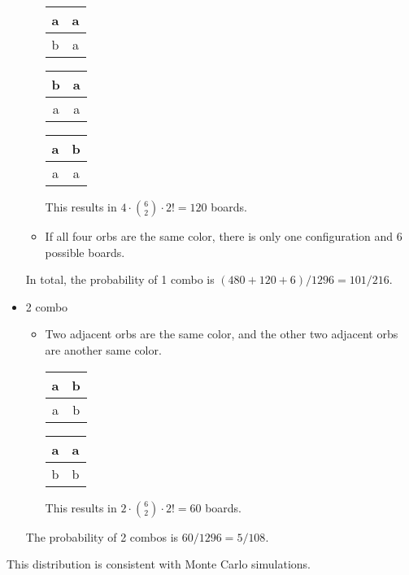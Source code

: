 \documentclass[12pt]{article}
\theoremstyle{definition}
\begin{document}
\begin{itemize}
\begin{itemize}
\begin{center}
            \quad
            \begin{tabular}{|c|c|}
            \hline
            a & a \\
            \hline
            b & a \\
            \hline
            \end{tabular}
            \quad
            \begin{tabular}{|c|c|}
            \hline
            b & a \\
            \hline
            a & a \\
            \hline
            \end{tabular}
            \quad
            \begin{tabular}{|c|c|}
            \hline
            a & b \\
            \hline
            a & a \\
            \hline
            \end{tabular}
        \end{center}
        This results in $4\cdot \binom{6}{2}\cdot 2!=120$ boards.
        \item 
        If all four orbs are the same color, there is only one configuration and $6$ possible boards.
    \end{itemize}
    In total, the probability of 1 combo is $(480+120+6)/1296=101/216$.
    \item 2 combo
    \begin{itemize}
        \item Two adjacent orbs are the same color, and the other two adjacent orbs are another same color.
        \begin{center}
            \begin{tabular}{|c|c|}
            \hline
            a & b \\
            \hline
            a & b \\
            \hline
            \end{tabular}
            \qquad
            \begin{tabular}{|c|c|}
            \hline
            a & a \\
            \hline
            b & b \\
            \hline
            \end{tabular}
        \end{center}
        This results in $2\cdot\binom{6}{2}\cdot 2!=60$ boards.
    \end{itemize}
    The probability of 2 combos is $60/1296=5/108$.
\end{itemize}
\begin{center}
\end{center}
This distribution is consistent with Monte Carlo simulations.
\end{document}
